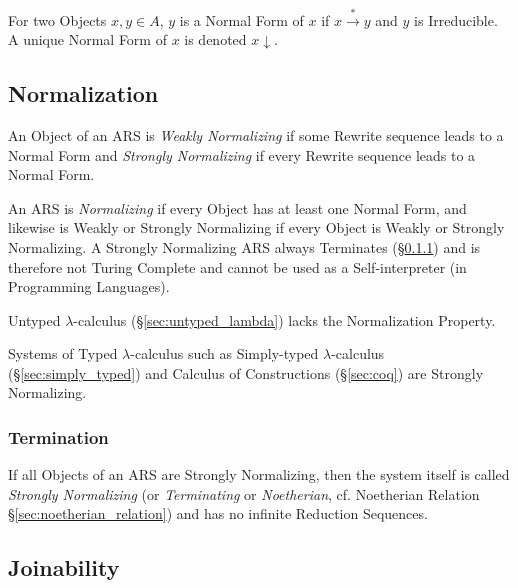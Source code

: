 For two Objects $x,y \in A$, $y$ is a Normal Form of $x$ if $x
\stackrel{*}{\rightarrow} y$ and $y$ is Irreducible. A unique Normal
Form of $x$ is denoted $x \downarrow$.



\subsection{Normalization}\label{sec:normalization}

An Object of an ARS is \emph{Weakly Normalizing} if some Rewrite
sequence leads to a Normal Form and \emph{Strongly Normalizing} if
every Rewrite sequence leads to a Normal Form.

An ARS is \emph{Normalizing} if every Object has at least one Normal
Form, and likewise is Weakly or Strongly Normalizing if every Object
is Weakly or Strongly Normalizing. A Strongly Normalizing ARS always
Terminates (\S\ref{sec:termination}) and is therefore not Turing
Complete and cannot be used as a Self-interpreter (in Programming
Languages).

Untyped $\lambda$-calculus (\S\ref{sec:untyped_lambda}) lacks the
Normalization Property.

Systems of Typed $\lambda$-calculus such as Simply-typed
$\lambda$-calculus (\S\ref{sec:simply_typed}) and Calculus of
Constructions (\S\ref{sec:coq}) are Strongly Normalizing.



\subsubsection{Termination}\label{sec:termination}

If all Objects of an ARS are Strongly Normalizing, then the system
itself is called \emph{Strongly Normalizing} (or \emph{Terminating} or
\emph{Noetherian}, cf. Noetherian Relation
\S\ref{sec:noetherian_relation}) and has no infinite Reduction
Sequences.



\subsection{Joinability}\label{sec:rewrite_join}

